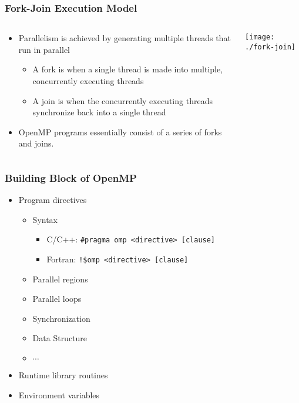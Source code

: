 \documentclass[slidestop,mathserif,compress,xcolor=svgnames]{beamer}
\newenvironment{bblock}[0]
{
\begin{beamerboxesrounded}[upper=uppercol1,lower=lowercol1,shadow=true]}
{\end{beamerboxesrounded}}
\newenvironment{eblock}[0]
{
\begin{beamerboxesrounded}[upper=uppercol2,lower=lowercol2,shadow=true]}
{\end{beamerboxesrounded}}
\begin{document}
\begin{frame}
  \frametitle{\small Fork-Join Execution Model}
  \begin{columns}
    \column{7cm}
    \begin{bblock}{}
      \begin{itemize}
        \item Parallelism is achieved by generating multiple threads that run in parallel
        \begin{itemize}
          \item A fork is when a single thread is made into multiple, concurrently executing threads
          \item A join is when the concurrently executing threads synchronize back into a single thread
        \end{itemize}
        \item OpenMP programs essentially consist of a series of forks and joins.
      \end{itemize}
    \end{bblock}
    \column{4cm}
    \begin{bblock}{}
      \begin{center}
        \texttt{[image: ./fork-join]}
      \end{center}
    \end{bblock}
  \end{columns}
\end{frame}


\begin{frame}
  \frametitle{\small Building Block of OpenMP}
  \begin{eblock}{}
    \begin{itemize}
      \item Program directives
        \begin{itemize}
          \item Syntax
            \begin{itemize}
              \item C/C++: \texttt{\#pragma omp <directive> [clause]}
              \item Fortran: \texttt{!\$omp <directive> [clause]}
            \end{itemize}
          \item Parallel regions
          \item Parallel loops
          \item Synchronization
          \item Data Structure
          \item $\cdots$
        \end{itemize}
      \item Runtime library routines
      \item Environment variables
    \end{itemize}
  \end{eblock}
\end{frame}
\end{document}
